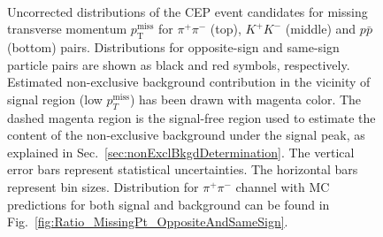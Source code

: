 \begin{figure}[h]
{  \begin{subfigure}[b]{\linewidth}\addtocounter{subfigure}{-2}\vspace*{17pt}
  \end{subfigure}\\
  \begin{minipage}[t][1.042\linewidth][t]{\linewidth}\vspace{20pt}
    \caption[Uncorrected distributions of the CEP event candidates for missing transverse momentum $p_\mathrm{T}^\mathrm{\scriptscriptstyle miss}$ for $\pi^+\pi^-$ (top), $K^+K^-$ (middle) and $p\bar{p}$ (bottom) pairs.]{Uncorrected distributions of the CEP event candidates for missing transverse momentum $p_\mathrm{T}^\mathrm{\scriptscriptstyle miss}$ for $\pi^+\pi^-$ (top), $K^+K^-$ (middle) and $p\bar{p}$ (bottom) pairs. Distributions for opposite-sign and same-sign particle pairs are shown as black and red symbols, respectively. Estimated non-exclusive background contribution in the vicinity of signal region (low $p_{T}^{\text{miss}}$) has been drawn with magenta color. The dashed magenta region is the signal-free region used to estimate the content of the non-exclusive background under the signal peak, as explained in Sec.~\ref{sec:nonExclBkgdDetermination}. The vertical error bars represent statistical uncertainties. The horizontal bars represent bin sizes. Distribution for $\pi^+\pi^-$ channel with MC predictions for both signal and background can be found in Fig.~\ref{fig:Ratio_MissingPt_OppositeAndSameSign}.}\label{fig:MissingPt}
  \end{minipage}
}%
\end{figure}

